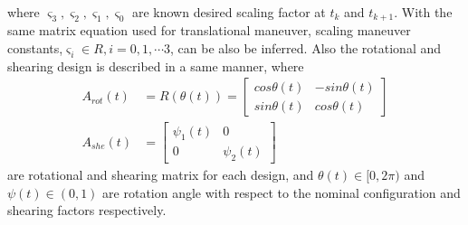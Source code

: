  where $\varsigma_3, \varsigma_2 ,\varsigma_1 , \varsigma_0$ are known desired scaling factor at $t_k$ and $t_{k+1}$. With the same matrix equation used for translational maneuver, scaling maneuver constants,$\varsigma_i \in R, i = 0, 1, \cdots 3$, can be also be inferred. 
 Also the rotational and shearing design is described in a same manner, where 
 \begin{align*}
    A_{rot}(t) &= R(\theta(t)) = 
    \begin{bmatrix}
        cos{\theta(t)}&-sin{\theta(t)}\\sin{\theta(t)}&cos{\theta(t)}
    \end{bmatrix}\\
    A_{she}(t) &=
    \begin{bmatrix}
        \psi_1(t)&0\\0&\psi_2(t)
    \end{bmatrix}
 \end{align*}
 are rotational and shearing matrix for each design, and $\theta(t) \in [0,2\pi)$ and $\psi(t)\in (0,1)$ are rotation angle with respect to the nominal configuration and shearing factors respectively. 
 
